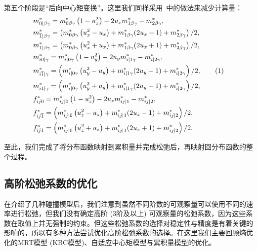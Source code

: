 第五个阶段是“后向中心矩变换”。这里我们同样采用~\citep{Geier-2015}中的做法来减少计算量：
\begin{align*}
    & m_{0 \mid \beta \gamma}^{*}=m_{0 \beta \gamma}^{*}\left(1-u_x^{2}\right)-2u_x m_{1 \beta \gamma}^{*}-m_{2 \beta \gamma}^{*}, \\
    & m_{\overline{1} \mid \beta \gamma}^{*}=\left(m_{0 \beta \gamma}^{*}\left(u_x^{2}-u_x\right)+m_{1 \beta \gamma}^{*}(2 u_x-1)+m_{2 \beta \gamma}^{*}\right) / 2, \\
    & m_{1 \mid \beta \gamma}^{*}=\left(m_{0 \beta \gamma}^{*}\left(u_x^{2}+u_x\right)+m_{1 \beta \gamma}^{*}(2 u_x+1)+m_{2 \beta \gamma}^{*}\right) / 2, \\
    & m_{i 0 \mid \gamma}^{*}=m_{i \mid 0 \gamma}^{*}\left(1-u_y^{2}\right)-2u_y m_{i \mid 1 \gamma}^{*}-m_{i \mid 2 \gamma}^{*}, \\
    & m_{i \overline{1} \mid \gamma}^{*}=\left(m_{i \mid 0 \gamma}^{*}\left(u_y^{2}-u_y\right)+m_{i \mid 1 \gamma}^{*}(2 u_y-1)+m_{i \mid 2 \gamma}^{*}\right) / 2, \stepcounter{equation}\tag{\theequation} \\
    & m_{i 1 \mid \gamma}^{*}=\left(m_{i \mid 0 \gamma}^{*}\left(u_y^{2}+u_y\right)+m_{i \mid 1 \gamma}^{*}(2 u_y+1)+m_{i \mid 2 \gamma}^{*}\right) / 2, \\
    & f_{i j 0}^{*}=m_{i j \mid 0}^{*}\left(1-u_z^{2}\right)-2u_z m_{i j \mid 1}^{*}-m_{i j \mid 2}^{*}, \\
    & f_{i j \overline{1}}^{*}=\left(m_{i j \mid 0}^{*}\left(u_z^{2}-u_z\right)+m_{i j \mid 1}^{*}(2 u_z-1)+m_{i j \mid 2}^{*}\right) / 2, \\
    & f_{i j 1}^{*}=\left(m_{i j \mid 0}^{*}\left(u_z^{2}+u_z\right)+m_{i j \mid 1}^{*}(2 u_z+1)+m_{i j \mid 2}^{*}\right) / 2 .
\end{align*}

至此，我们完成了将分布函数映射到累积量并完成松弛后，再映射回分布函数的整个过程。

\subsection{高阶松弛系数的优化}
\label{sec:background_acmmrt}
在介绍了几种碰撞模型后，我们注意到虽然不同阶数的可观察量可以使用不同的速率进行松弛，但我们没有确定高阶 (3阶及以上) 可观察量的松弛系数，因为这些系数在取值上并无强制的约束。但这些松弛系数的选择对稳定性与精度是有着关键的影响的，所以有多种方法尝试优化高阶松弛系数的选择。在这里我们主要回顾熵优化的MRT模型 (KBC模型)、自适应中心矩模型与累积量模型的优化。

